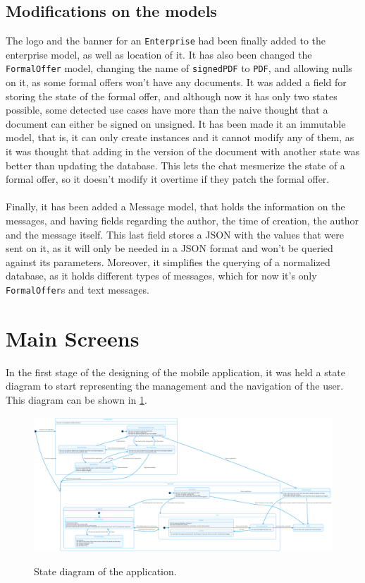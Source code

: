 \documentclass[./main.tex]{subfiles}
\begin{document}
\subsection{Modifications on the models}
The logo and the banner for an \texttt{Enterprise} had been finally added to the enterprise model, as well as  location of it. It has also been changed the \texttt{FormalOffer} model, changing the name of \texttt{signedPDF} to \texttt{PDF}, and allowing nulls on it, as some formal offers won't have any documents. It was added a field for storing the state of the formal offer, and although now it has only two states possible, some detected use cases have more than the naive thought that a document can either be signed on unsigned. It has been made it an immutable model, that is, it can only create instances and it cannot modify any of them, as it was thought that adding in the version of the document with another state was better than updating the database. This lets the chat mesmerize the state of a formal offer, so it doesn't modify it overtime if they patch the formal offer.\\
\\
Finally, it has been added a Message model, that holds the information on the messages, and having fields regarding the author, the time of creation, the author and the message itself. This last field stores a JSON with the values that were sent on it, as it will only be needed in a JSON format and won't be queried against its parameters. Moreover, it simplifies the querying of a normalized database, as it holds different types of messages, which for now it's only \texttt{FormalOffer}s and text messages.
\section{Main Screens} \label{sec:views}
In the first stage of the designing of the mobile application, it was held a state diagram to start representing the management and the navigation of the user. This diagram can be shown in \ref{fig:stateapp}.
\begin{figure}[H]
	\centering
	\includegraphics[width=14cm]{stateapp.png}
	\label{fig:stateapp}
	\caption{State diagram of the application.}
\end{figure}
\end{document}
